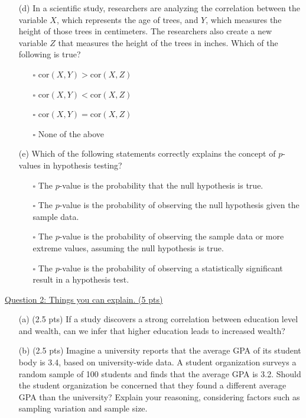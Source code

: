 \documentclass{./../../Latex/tests}
\begin{document}
\begin{enumerate}
\newpage
\item[(d)] In a scientific study, researchers are analyzing the correlation between the variable \( X \), which represents the age of trees, and \( Y \), which measures the height of those trees in centimeters. The researchers also create a new variable \( Z \) that measures the height of the trees in inches. Which of the following is true?

\begin{itemize}
\item[$\square$] \( \text{cor}(X, Y) >\text{cor}(X, Z) \)
\item[$\square$] \( \text{cor}(X, Y) < \text{cor}(X, Z) \)
\item[$\square$] \( \text{cor}(X, Y) = \text{cor}(X, Z) \)
\item[$\square$] None of the above \\
\end{itemize}


\item[(e)] Which of the following statements correctly explains the concept of $p$-values in hypothesis testing?
\begin{enumerate}
\item[$\square$] The $p$-value is the probability that the null hypothesis is true.
\item[$\square$] The $p$-value is the probability of observing the null hypothesis given the sample data.
\item[$\square$] The $p$-value is the probability of observing the sample data or more extreme values, assuming the null hypothesis is true.
\item[$\square$] The $p$-value is the probability of observing a statistically significant result in a hypothesis test.
\end{enumerate}
\end{enumerate}


\newpage
\underline{Question 2: Things you can explain. (5 pts)}
\begin{enumerate}

\item[(a)] (2.5 pts) If a study discovers a strong correlation between education level and wealth, can we infer that higher education leads to increased wealth?
\vspace{7.5cm}

\item[(b)] (2.5 pts) Imagine a university reports that the average GPA of its student body is 3.4, based on university-wide data. A student organization surveys a random sample of 100 students and finds that the average GPA is 3.2. Should the student organization be concerned that they found a different average GPA than the university? Explain your reasoning, considering factors such as sampling variation and sample size.
\end{enumerate}
\end{document}
